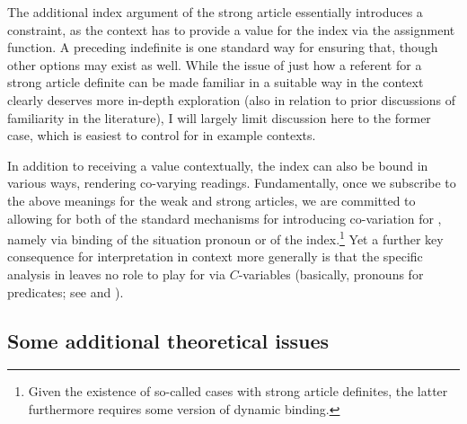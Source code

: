 \documentclass[output=paper
,modfonts
,nonflat]{langscibook}
\begin{document}
The additional index argument of the strong article essentially
introduces a  constraint, as the context has to provide a
value for the index via the assignment function. A preceding
indefinite is one standard way for ensuring that, though other options
may exist as well. While the issue of just how a referent for a strong
article definite can be made familiar in a suitable way in the context
clearly deserves more in-depth exploration (also in relation to prior
discussions of familiarity in the literature), I will largely limit
discussion here to the former case, which is easiest to control for in
example contexts. 

In addition to receiving a value contextually, the
index can also be bound in various ways, rendering co-varying
readings. Fundamentally, once we subscribe to the above meanings for
the weak and strong articles, we are committed to allowing for both of
the standard mechanisms for introducing co-variation for ,
namely via binding of the situation pronoun or of the
index.\footnote{Given the existence of so-called  cases
  with strong article definites, the latter furthermore requires some
  version of dynamic binding.} Yet a
further key consequence for interpretation in context more generally
is that
the specific analysis in \citet{Schwarz2009} leaves no role to play
for  via $C$-variables (basically, pronouns for
predicates; see \citealt{Fintel1994} and \citealt{StanleySzabo2000}). 


\subsection{Some additional theoretical issues}
\end{document}
